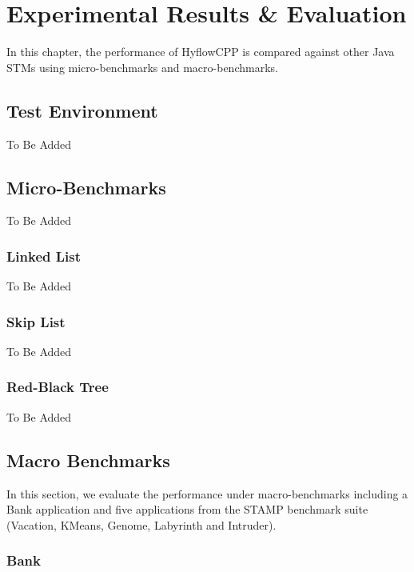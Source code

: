 \documentclass[12pt,english]{report}
\begin{document}
\chapter{Experimental Results \& Evaluation}\label{chap:expResults}

In this chapter, the performance of HyflowCPP is compared against other Java STMs using micro-benchmarks and macro-benchmarks.

\section{Test Environment}

To Be Added

\section{Micro-Benchmarks}

To Be Added 

\subsection{Linked List\label{sub:Linked-List}}

To Be Added 

\subsection{Skip List}

To Be Added 

\subsection{Red-Black Tree}

To Be Added 

\section{Macro Benchmarks}

In this section, we evaluate the performance under macro-benchmarks including a Bank application and five applications from the STAMP benchmark suite~\cite{caominh:stamp:iiswc:2008} (Vacation, KMeans, Genome,
Labyrinth and Intruder).

\subsection{Bank}
\end{document}

